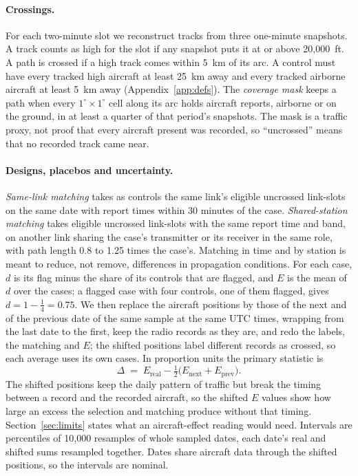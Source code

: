 \documentclass[11pt]{article}
\begin{document}
\paragraph{Crossings.} For each two-minute slot we reconstruct tracks from three one-minute snapshots. A track counts as high for the slot if any snapshot puts it at or above 20{,}000~ft. A path is crossed if a high track comes within 5~km of its arc. A control must have every tracked high aircraft at least 25~km away and every tracked airborne aircraft at least 5~km away (Appendix~\ref{app:defs}). The \emph{coverage mask} keeps a path when every $1^\circ\times1^\circ$ cell along its arc holds aircraft reports, airborne or on the ground, in at least a quarter of that period's snapshots. The mask is a traffic proxy, not proof that every aircraft present was recorded, so ``uncrossed'' means that no recorded track came near.

\paragraph{Designs, placebos and uncertainty.} \emph{Same-link matching} takes as controls the same link's eligible uncrossed link-slots on the same date with report times within 30 minutes of the case. \emph{Shared-station matching} takes eligible uncrossed link-slots with the same report time and band, on another link sharing the case's transmitter or its receiver in the same role, with path length 0.8 to 1.25 times the case's. Matching in time and by station is meant to reduce, not remove, differences in propagation conditions. For each case, $d$ is its flag minus the share of its controls that are flagged, and $E$ is the mean of $d$ over the cases; a flagged case with four controls, one of them flagged, gives $d=1-\tfrac14=0.75$. We then replace the aircraft positions by those of the next and of the previous date of the same sample at the same UTC times, wrapping from the last date to the first, keep the radio records as they are, and redo the labels, the matching and $E$; the shifted positions label different records as crossed, so each average uses its own cases. In proportion units the primary statistic is
\[
  \Delta \;=\; E_{\text{real}}-\tfrac12\bigl(E_{\text{next}}+E_{\text{prev}}\bigr).
\]
The shifted positions keep the daily pattern of traffic but break the timing between a record and the recorded aircraft, so the shifted $E$ values show how large an excess the selection and matching produce without that timing. Section~\ref{sec:limits} states what an aircraft-effect reading would need. Intervals are percentiles of 10{,}000 resamples of whole sampled dates, each date's real and shifted sums resampled together. Dates share aircraft data through the shifted positions, so the intervals are nominal.
\end{document}

